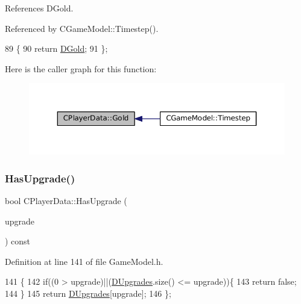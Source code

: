 References D\+Gold.



Referenced by C\+Game\+Model\+::\+Timestep().


\begin{DoxyCode}
89                         \{
90             \textcolor{keywordflow}{return} \hyperlink{classCPlayerData_afa66ff31262c9b287ae8c13259aae6f3}{DGold};   
91         \};
\end{DoxyCode}
Here is the caller graph for this function\+:\nopagebreak
\begin{figure}[H]
\begin{center}
\leavevmode
\includegraphics[width=350pt]{classCPlayerData_afa5c728fc86335a9ca00b5121c0ec765_icgraph}
\end{center}
\end{figure}
\hypertarget{classCPlayerData_abba8a81a8d4d8309e8cd68016ee1900b}{}\label{classCPlayerData_abba8a81a8d4d8309e8cd68016ee1900b} 
\subsubsection{\texorpdfstring{Has\+Upgrade()}{HasUpgrade()}}
{\footnotesize\ttfamily bool C\+Player\+Data\+::\+Has\+Upgrade (\begin{DoxyParamCaption}\item[{\hyperlink{GameDataTypes_8h_a35b98ce26aca678b03c6f9f76e4778ce}{E\+Asset\+Capability\+Type}}]{upgrade }\end{DoxyParamCaption}) const\hspace{0.3cm}{\ttfamily [inline]}}



Definition at line 141 of file Game\+Model.\+h.


\begin{DoxyCode}
141                                                            \{
142             \textcolor{keywordflow}{if}((0 > upgrade)||(\hyperlink{classCPlayerData_ae7cb90c31ec46b65ba88485368a4b96a}{DUpgrades}.size() <= upgrade))\{
143                 \textcolor{keywordflow}{return} \textcolor{keyword}{false};   
144             \}
145             \textcolor{keywordflow}{return} \hyperlink{classCPlayerData_ae7cb90c31ec46b65ba88485368a4b96a}{DUpgrades}[upgrade];
146         \};
\end{DoxyCode}
\hypertarget{classCPlayerData_a5bd2ebe2e3dc25669bb312226e087fd1}{}\label{classCPlayerData_a5bd2ebe2e3dc25669bb312226e087fd1} 
